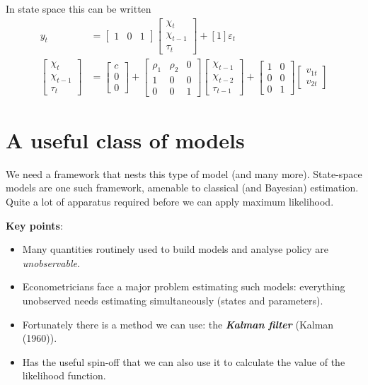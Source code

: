 \documentclass[
  letterpaper,
]{book}
\providecommand{\tightlist}{%
  \setlength{\itemsep}{0pt}\setlength{\parskip}{0pt}}\usepackage{longtable,booktabs,array}
\begin{document}
In state space this can be written \begin{align}
y_t &=
\begin{bmatrix} 1 & 0 & 1 \end{bmatrix}
 \begin{bmatrix} \chi_t \\ \chi_{t-1} \\ \tau_t \end{bmatrix} + [1] \varepsilon_t\\
 \begin{bmatrix} \chi_t \\ \chi_{t-1} \\ \tau_t \end{bmatrix} &=
\begin{bmatrix} c \\ 0 \\ 0 \end{bmatrix} +
 \begin{bmatrix} \rho_1 & \rho_2 & 0 \\ 1 & 0 & 0 \\ 0 & 0 & 1 \end{bmatrix}
\begin{bmatrix} \chi_{t-1} \\ \chi_{t-2} \\ \tau_{t-1} \end{bmatrix} +
 \begin{bmatrix} 1 & 0 \\ 0 & 0 \\ 0 & 1 \end{bmatrix}
\begin{bmatrix} v_{1t} \\ v_{2t} \end{bmatrix}
\end{align}

\hypertarget{a-useful-class-of-models-1}{%
\section{A useful class of models}\label{a-useful-class-of-models-1}}

We need a framework that nests this type of model (and many more).
State-space models are one such framework, amenable to classical (and
Bayesian) estimation. Quite a lot of apparatus required before we can
apply maximum likelihood.

\textbf{Key points}:

\begin{itemize}
\tightlist
\item
  Many quantities routinely used to build models and analyse policy are
  \emph{unobservable}.
\item
  Econometricians face a major problem estimating such models:
  everything unobserved needs estimating simultaneously (states and
  parameters).
\item
  Fortunately there is a method we can use: the \textbf{\emph{Kalman
  filter}} (Kalman (1960)).
\item
  Has the useful spin-off that we can also use it to calculate the value
  of the likelihood function.
\end{itemize}
\end{document}

